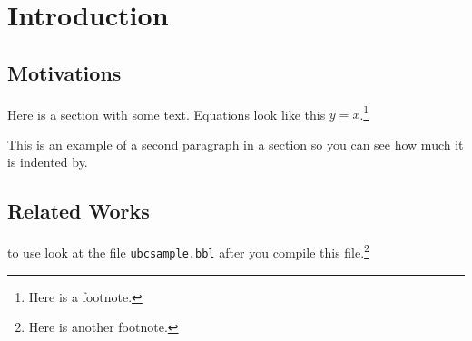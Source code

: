 \documentclass[msc,oneside]{ubcthesis}
\begin{document}



\mainmatter


\chapter{Introduction}

\section{Motivations}
Here is a section with some text.  Equations look like this
$y=x$.\footnote{Here is a footnote.}

This is an example of a second paragraph in a section so you can
see how much it is indented by.

\section{Related Works}

to use look at the file \texttt{ubcsample.bbl} after you compile this
file.\footnote{Here is another footnote.}
\end{document}
